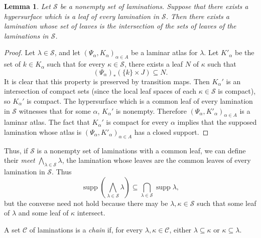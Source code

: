 \documentclass[reqno,11pt]{amsart}
\DeclareMathOperator{\supp}{supp}
\newcommand{\dfn}[1]{\emph{#1}\index{#1}}
\newtheorem{lemma}[theorem]{Lemma}
\theoremstyle{definition}
\numberwithin{equation}{section}
\begin{document}
\begin{lemma}\label{existence of intersections}
Let $\mathscr S$ be a nonempty set of laminations.
Suppose that there exists a hypersurface which is a leaf of every lamination in $\mathscr S$.
Then there exists a lamination whose set of leaves is the intersection of the sets of leaves of the laminations in $\mathscr S$.
\end{lemma}
\begin{proof}
Let $\lambda \in \mathscr S$, and let $(\Psi_\alpha, K_\alpha)_{\alpha \in A}$ be a laminar atlas for $\lambda$.
Let $K'_\alpha$ be the set of $k \in K_\alpha$ such that for every $\kappa \in \mathscr S$, there exists a leaf $N$ of $\kappa$ such that
$$(\Psi_\alpha)_*(\{k\} \times J) \subseteq N.$$
It is clear that this property is preserved by transition maps.
Then $K_\alpha'$ is an intersection of compact sets (since the local leaf spaces of each $\kappa \in \mathscr S$ is compact), so $K_\alpha'$ is compact.
The hypersurface which is a common leaf of every lamination in $\mathscr S$ witnesses that for some $\alpha$, $K_\alpha'$ is nonempty.
Therefore $(\Psi_\alpha, K'_\alpha)_{\alpha \in A}$ is a laminar atlas.
The fact that $K_\alpha'$ is compact for every $\alpha$ implies that the supposed lamination whose atlas is $(\Psi_\alpha, K'_\alpha)_{\alpha \in A}$ has a closed support.
\end{proof}

Thus, if $\mathscr S$ is a nonempty set of laminations with a common leaf, we can define their \dfn{meet} $\bigwedge_{\lambda \in \mathscr S} \lambda$, the lamination whose leaves are the common leaves of every lamination in $\mathscr S$.
Thus
$$\supp \left(\bigwedge_{\lambda \in \mathscr S} \lambda\right) \subseteq \bigcap_{\lambda \in \mathscr S} \supp \lambda,$$
but the converse need not hold because there may be $\lambda, \kappa \in \mathscr S$ such that some leaf of $\lambda$ and some leaf of $\kappa$ intersect.

A set $\mathscr C$ of laminations is a \dfn{chain} if, for every $\lambda, \kappa \in \mathscr C$, either $\lambda \subseteq \kappa$ or $\kappa \subseteq \lambda$.
\end{document}
